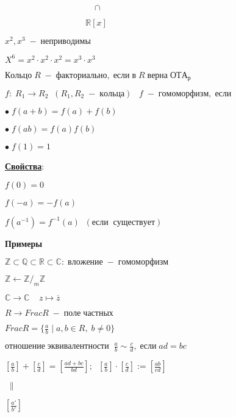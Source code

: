 \documentclass[a4paper,12pt]{article}
\theoremstyle{plain}
\begin{document}
$\;\;\;\;\;\;\;\;\;\;\;\;\;\;\;\;\;\;\;\;\;\;\;\;\;\;\;\;\;\;\;\;\;\;\;\;\;\cap$

$\;\;\;\;\;\;\;\;\;\;\;\;\;\;\;\;\;\;\;\;\;\;\;\;\;\;\;\;\;\;\;\;\;\;\mathbb{R}[x]$

$x^{2}, x^{3}\;-\;неприводимы$

$X^{6}=x^{2}\cdot x^{2}\cdot x^{2}=x^{3}\cdot x^{3}$

\begin{def*}
$Кольцо\;R\;-\;факториально,\; если\; в\; R\; верна\; ОТА_{р}$
\end{def*}

\begin{def*}
$f:\; R_{1} \rightarrow R_{2} \;\;(R_{1}, R_{2}\; -\; кольца)\;\;\; f\;-\; гомоморфизм,\; если\;$

$\bullet\; f(a+b)=f(a)+f(b)$

$\bullet\; f(ab)=f(a)f(b)$

$\bullet\; f(1)=1$
\end{def*}


\underline{\textbf{Свойства}}:

$f(0)=0$

$f(-a)=-f(a)$

$f(a^{-1})=f^{-1}(a)\;\;(если\;\;существует)$

\textbf{Примеры}

$\mathbb{Z}\subset\mathbb{Q}\subset\mathbb{R}\subset\mathbb{C}:\; вложение\;-\;гомоморфизм$

$\mathbb{Z}\leftarrow\mathbb{Z}/_{m}\mathbb{Z}$

$\mathbb{C} \rightarrow \mathbb{C}\;\;\;\; z\mapsto \overline{z}$

$R \longrightarrow Frac R\;-\; поле\; частных$

$FracR=\{\frac{a}{b}\;|\;a, b\in R,\; b\neq 0\}$

$отношение\; эквивалентности\;\; \frac{a}{b}\sim\frac{c}{d},\; если\; ad=bc$

$[\frac{a}{b}]+[\frac{c}{d}]=[\frac{ad+bc}{bd}];\;\; [\frac{a}{b}]\cdot[\frac{c}{d}]:=[\frac{ab}{cd}]$

$\;\parallel$

$[\frac{a'}{b'}]$
\end{document}
